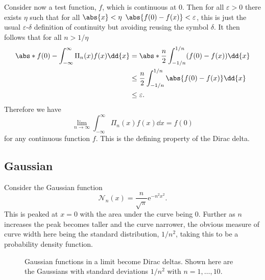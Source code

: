 \documentclass[fleqn]{NotesClass}
\newcommand*{\e}{\mathrm{e}}
\begin{document}
    Consider now a test function, \(f\), which is continuous at \(0\).
    Then for all \(\varepsilon > 0\) there exists \(\eta\) such that for all \(\abs{x} < \eta\) \(\abs{f(0) - f(x)} < \varepsilon\), this is just the usual \(\varepsilon\)-\(\delta\) definition of continuity but avoiding reusing the symbol \(\delta\).
    It then follows that for all \(n > 1/\eta\)
    \begin{align}
        \abs*{f(0) - \int_{-\infty}^{\infty} \Pi_n(x)f(x) \dd{x}} &= \abs*{ \frac{n}{2} \int_{-1/n}^{1/n} (f(0) - f(x))\dd{x} }\\
        &\le \frac{n}{2} \int_{-1/n}^{1/n} \abs{f(0) - f(x)} \dd{x}\\
        &\le \varepsilon.
    \end{align}
    Therefore we have
    \begin{equation}
        \lim_{n\to\infty} \int_{-\infty}^{\infty} \Pi_n(x)f(x) \dd{x} = f(0)
    \end{equation}
    for any continuous function \(f\).
    This is the defining property of the Dirac delta.
    
    \subsection{Gaussian}
    Consider the Gaussian function
    \begin{equation}
        \mathcal{N}_n(x) = \frac{n}{\sqrt{\pi}} \e^{-n^2x^2}.
    \end{equation}
    This is peaked at \(x = 0\) with the area under the curve being 0.
    Further as \(n\) increases the peak becomes taller and the curve narrower, the obvious measure of curve width here being the standard distribution, \(1/n^2\), taking this to be a probability density function.
    
    \begin{figure}
        \caption{Gaussian functions in a limit become Dirac deltas. Shown here are the Gaussians with standard deviations \(1/n^2\) with \(n = 1, \dotsc, 10\).}
    \end{figure}
    
\end{document}
